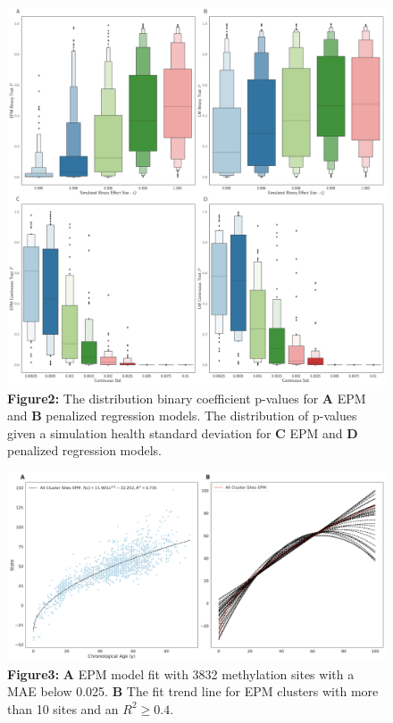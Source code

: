 \documentclass{article}
\begin{document}
{\begin{center}
    \begin{figure}
    \includegraphics[scale=.25]{Figures/Figure2.png}
    \footnotesize
    \caption*{\small \textbf{Figure2:} The distribution binary coefficient p-values for \textbf{A} EPM and \textbf{B} 
    penalized regression models. The distribution of p-values given a simulation health standard 
    deviation for \textbf{C} EPM and \textbf{D} penalized regression models.}
    \end{figure}
\end{center}


\begin{center}
    \begin{figure}
    \includegraphics[scale=.25]{Figures/Figure3.png}
    \footnotesize
    \caption*{\small \textbf{Figure3:} \textbf{A} EPM model fit with 3832 methylation sites with a MAE below 0.025. 
                    \textbf{B} The fit trend line for EPM clusters with more than 10 sites and an $R^2 \geq 0.4$.}
    \end{figure}
\end{center}

}
\end{document}
